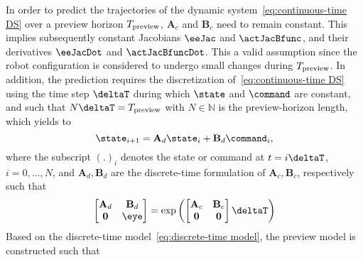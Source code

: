 In order to predict the trajectories of the dynamic system~\eqref{eq:continuous-time DS} over a preview horizon $T_{\rm preview}$, $\mathbf{A}_c$ and $\mathbf{B}_c$ need to remain constant. This implies subsequently constant Jacobians $\eeJac$ and $\actJacBfunc$, and their derivatives $\eeJacDot$ and $\actJacBfuncDot$. This a valid assumption since the robot configuration is considered to undergo small changes during $T_{\rm preview}$. In addition, the  prediction requires the discretization of~\eqref{eq:continuous-time DS} using the time step $\deltaT$ during which $\state$ and $\command$ are constant, and such that $N\deltaT = T_{\rm preview}$ with $N\in\mathbb{N}$ is the preview-horizon length, which yields to 
\begin{equation}\label{eq:discrete-time model}
	\state_{i+1} = \mathbf{A}_d \state_{i} + \mathbf{B}_d \command_i,
\end{equation}
where the subscript $(.)_i$ denotes the state or command at $t=i\deltaT$, $i=0,\ldots,N$, and $\mathbf{A}_d, \mathbf{B}_d$ are the discrete-time formulation of $\mathbf{A}_c, \mathbf{B}_c$, respectively such that~\cite{decarlo1989book}
\begin{equation}
	 \begin{bmatrix}
	 	\mathbf{A}_d&  \mathbf{B}_d \\ \mathbf{0} & \eye 
	 \end{bmatrix} = \exp\left(\begin{bmatrix}
	 \mathbf{A}_c&  \mathbf{B}_c \\ \mathbf{0} & \mathbf{0} 
 \end{bmatrix}\deltaT\right)
\end{equation}
Based on the discrete-time model~\eqref{eq:discrete-time model}, the preview model is constructed such that 
